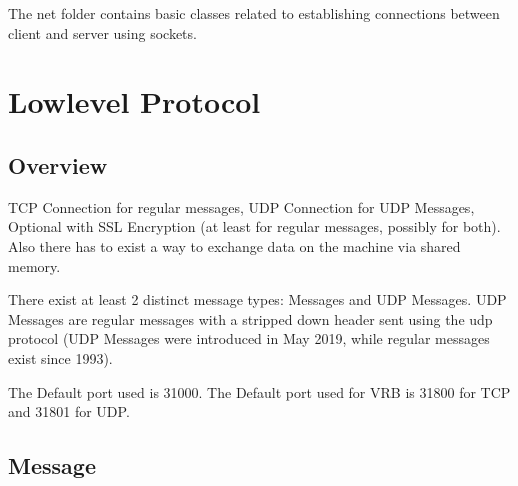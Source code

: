 \newenvironment{tcpmessage}[2]{\rowcolors{2}{send.light}{send.dark} \paragraph{#1 (Type #2)}\mbox{}\\ \begin{longtable}{||p{2cm}|p{4cm}|p{2cm}|p{6cm}||}
		\hline \rowcolor{send.head} \textbf{Index} & \textbf{Name} & \textbf{Type}& \textbf{Description} \\
		\hline\hline
		\rowcolor{send.subhead} \multicolumn{4}{||c||}{\textbf{HEADER}} \\
		\hline
			\paramfour{0..3}{sender}{int32}{Sender ID, max 3 byte verwenden}
			\paramfour{4..7}{sender\_type}{int32}{Sender Type}
			\paramfour{8..11}{message\_type}{int32}{MessageType #2:\newline #1}
			\paramfour{12..15}{length}{int32}{Length of payload in Bytes}
			\rowcolor{send.subhead} \multicolumn{4}{||c||}{\textbf{PAYLOAD}} \\
			\hline
}{\end{longtable}}

The net folder contains basic classes related to establishing connections between client and server using sockets.

\section{Lowlevel Protocol}

\subsection{Overview}

TCP Connection for regular messages, UDP Connection for UDP Messages, Optional with SSL Encryption (at least for regular messages, possibly for both). Also there has to exist a way to exchange data on the machine via shared memory.

There exist at least 2 distinct message types: Messages and UDP Messages. UDP Messages are regular messages with a stripped down header sent using the udp protocol (UDP Messages were introduced in May 2019, while regular messages exist since 1993).

The Default port used is 31000.
The Default port used for VRB is 31800 for TCP and 31801 for UDP.


\subsection{Message}

